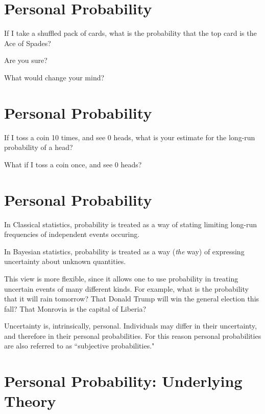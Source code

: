 
\section*{\hfil Personal Probability}

If I take a shuffled pack of cards, what is the probability
that the top card is the Ace of Spades? 

Are you sure?

What would change your mind?

\es\bs

\section*{\hfil Personal Probability}

If I toss a coin 10 times, and see 0 heads, what is your estimate
for the long-run probability of a head?

What if I toss a coin once, and see 0 heads?

\es\bs

\section*{\hfil Personal Probability}

In Classical statistics, probability is treated as a way of stating
limiting long-run frequencies of independent events occuring.

In Bayesian statistics, probability is treated as a way ({\it the} way)
of expressing uncertainty about unknown quantities.

This view is more flexible, since it allows one to use
probability in treating uncertain events of many different kinds.
For example, what is the probability 
that it will rain tomorrow? That Donald Trump will win
the general election this fall?
That Monrovia is the capital of Liberia?

Uncertainty is, intrinsically, personal. Individuals may differ in their uncertainty, and therefore
in their personal probabilities.   For this reason personal probabilities are also
referred to as ``subjective probabilities." 

\es\bs

\section*{Personal Probability: Underlying Theory}

